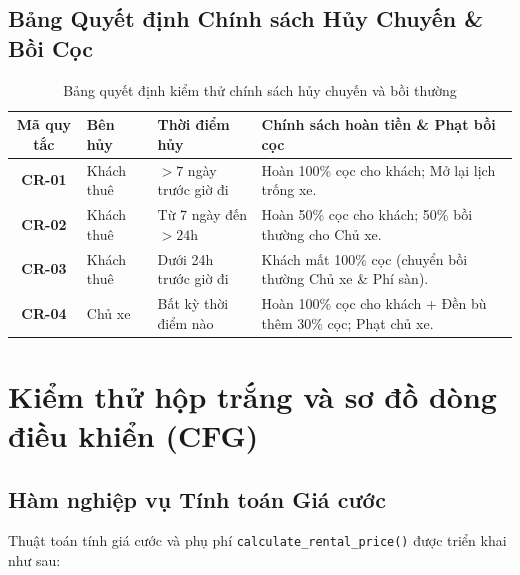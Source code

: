 \documentclass[12pt,a4paper,oneside]{report}
\begin{document}
\section{Bảng Quyết định Chính sách Hủy Chuyến \& Bồi Cọc}
\begin{table}[ht]
  \centering\small
  \begin{tabularx}{\textwidth}{cllX}
    \toprule
    \textbf{Mã quy tắc} & \textbf{Bên hủy} & \textbf{Thời điểm hủy} & \textbf{Chính sách hoàn tiền \& Phạt bồi cọc} \\
    \midrule
    \textbf{CR-01} & Khách thuê & $> 7$ ngày trước giờ đi & Hoàn 100\% cọc cho khách; Mở lại lịch trống xe. \\
    \textbf{CR-02} & Khách thuê & Từ 7 ngày đến $> 24$h & Hoàn 50\% cọc cho khách; 50\% bồi thường cho Chủ xe. \\
    \textbf{CR-03} & Khách thuê & Dưới 24h trước giờ đi & Khách mất 100\% cọc (chuyển bồi thường Chủ xe \& Phí sàn). \\
    \textbf{CR-04} & Chủ xe & Bất kỳ thời điểm nào & Hoàn 100\% cọc cho khách + Đền bù thêm 30\% cọc; Phạt chủ xe. \\
    \bottomrule
  \end{tabularx}
  \caption{Bảng quyết định kiểm thử chính sách hủy chuyến và bồi thường}
  \label{tab:decision_cancellation}
\end{table}



\chapter{Kiểm thử hộp trắng và sơ đồ dòng điều khiển (CFG)}

\section{Hàm nghiệp vụ Tính toán Giá cước}
Thuật toán tính giá cước và phụ phí \texttt{calculate\_rental\_price()} được triển khai như sau:
\end{document}
